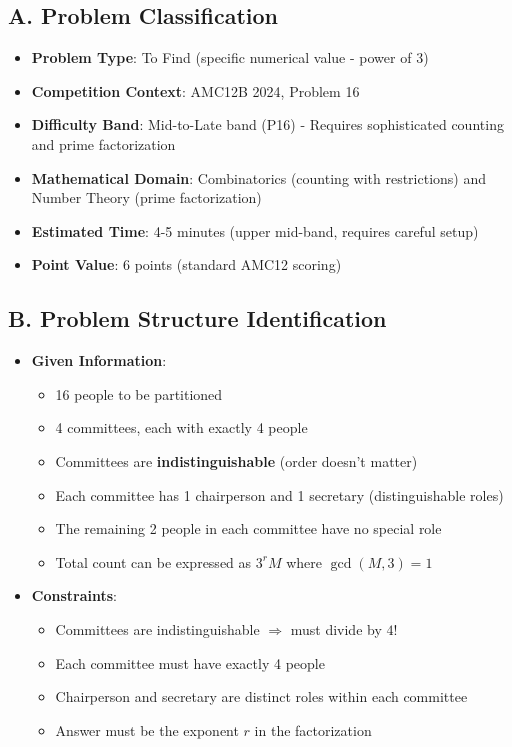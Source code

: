 \documentclass[12pt]{article}
\begin{document}
\begin{problemconfigbox}
\subsection*{A. Problem Classification}
\begin{itemize}[leftmargin=*]
    \item \textbf{Problem Type}: To Find (specific numerical value - power of 3)
    \item \textbf{Competition Context}: AMC12B 2024, Problem 16
    \item \textbf{Difficulty Band}: Mid-to-Late band (P16) - Requires sophisticated counting and prime factorization
    \item \textbf{Mathematical Domain}: Combinatorics (counting with restrictions) and Number Theory (prime factorization)
    \item \textbf{Estimated Time}: 4-5 minutes (upper mid-band, requires careful setup)
    \item \textbf{Point Value}: 6 points (standard AMC12 scoring)
\end{itemize}

\subsection*{B. Problem Structure Identification}
\begin{itemize}[leftmargin=*]
    \item \textbf{Given Information}: 
    \begin{itemize}
        \item 16 people to be partitioned
        \item 4 committees, each with exactly 4 people
        \item Committees are \textbf{indistinguishable} (order doesn't matter)
        \item Each committee has 1 chairperson and 1 secretary (distinguishable roles)
        \item The remaining 2 people in each committee have no special role
        \item Total count can be expressed as $3^r M$ where $\gcd(M, 3) = 1$
    \end{itemize}
    
    \item \textbf{Constraints}: 
    \begin{itemize}
        \item Committees are indistinguishable $\Rightarrow$ must divide by $4!$
        \item Each committee must have exactly 4 people
        \item Chairperson and secretary are distinct roles within each committee
        \item Answer must be the exponent $r$ in the factorization
    \end{itemize}
    

\end{itemize}
\end{problemconfigbox}
\end{document}

